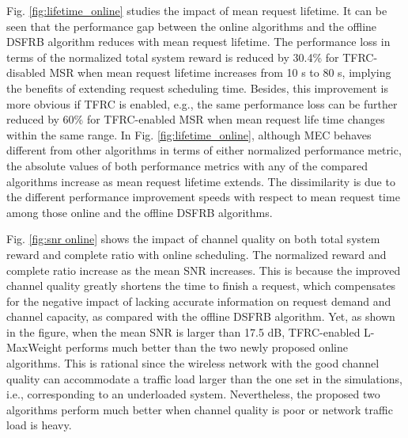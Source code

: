 \documentclass[journal,letterpaper,12pt,oneside,onecolumn,draftclsnofoot]{IEEEtran}
\begin{document}
Fig. \ref{fig:lifetime_online} studies the impact of mean request lifetime. It can be seen that the performance gap between the online algorithms and the offline DSFRB algorithm reduces with mean request lifetime. The performance loss in terms of the normalized total system reward is reduced by 30.4\%
for TFRC-disabled  MSR when mean request lifetime increases from 10 s to 80 s, implying the benefits of extending request scheduling time. Besides, this improvement is more obvious if TFRC is enabled, e.g., the same performance loss can be further reduced by 60\%
for TFRC-enabled MSR when mean request life time changes within the same range.
In Fig. \ref{fig:lifetime_online}, although MEC behaves different from other algorithms in terms of either normalized performance metric,
the absolute values of both performance metrics with any of the compared algorithms increase as mean request lifetime extends.
The dissimilarity is due to the different performance improvement speeds with respect to mean request time among those online and the offline DSFRB algorithms.


Fig. \ref{fig:snr online} shows the impact of channel quality on both total system reward and complete ratio with online scheduling.
The normalized reward and complete ratio increase as the mean SNR increases.
This is because the improved channel quality greatly shortens the time to finish a request, which compensates for the negative impact of lacking accurate information on request demand and channel capacity, as compared with the offline DSFRB algorithm.
Yet, as shown in the figure, when the mean SNR is larger than 17.5 dB, TFRC-enabled L-MaxWeight performs much better than the two newly proposed online algorithms. This is rational since the wireless network with the good channel quality can accommodate a traffic load larger than the one set in the simulations, i.e., corresponding to an underloaded system.
Nevertheless, the proposed two algorithms perform much better when channel quality is poor or network traffic load is heavy.
\end{document}
